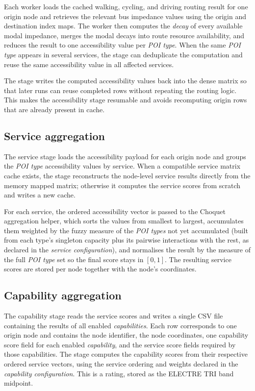 \documentclass{article}
\begin{document}
Each worker loads the cached walking, cycling, and driving routing result for one origin node and retrieves
the relevant bus impedance values using the origin and destination index maps.
The worker then computes the \emph{decay} of every available modal impedance,
merges the modal decays into route resource availability, and reduces the
result to one accessibility value per \emph{POI type}. When the same
\emph{POI type} appears in several services, the stage can deduplicate the
computation and reuse the same accessibility value in all affected services.

The stage writes the computed accessibility values back into the dense matrix
so that later runs can reuse completed rows without repeating the routing
logic. This makes the accessibility stage resumable and avoids recomputing
origin rows that are already present in cache.

\subsection{Service aggregation}
The service stage loads the accessibility payload for each origin node and
groups the \emph{POI type} accessibility values by service. When a compatible
service matrix cache exists, the stage reconstructs the node-level service
results directly from the memory mapped matrix; otherwise it computes the
service scores from scratch and writes a new cache.

For each service, the ordered accessibility vector is passed to the Choquet
aggregation helper, which sorts the values from smallest to largest,
accumulates them weighted by the fuzzy measure of the \emph{POI types} not
yet accumulated (built from each type's singleton capacity plus its pairwise
interactions with the rest, as declared in the \emph{service configuration}),
and normalises the result by the measure of the full \emph{POI type} set so
the final score stays in $[0,1]$. The resulting service scores are stored per
node together with the node's coordinates.

\subsection{Capability aggregation}
The capability stage reads the service scores and writes a single CSV file
containing the results of all enabled \emph{capabilities}. Each row corresponds
to one origin node and contains the node identifier, the node coordinates, one
capability score field for each enabled \emph{capability}, and the service score
fields required by those capabilities. The stage computes the capability scores
from their respective ordered service vectors, using the service ordering and
weights declared in the \emph{capability configuration}. This is a rating,
stored as the ELECTRE TRI band midpoint.
\end{document}
